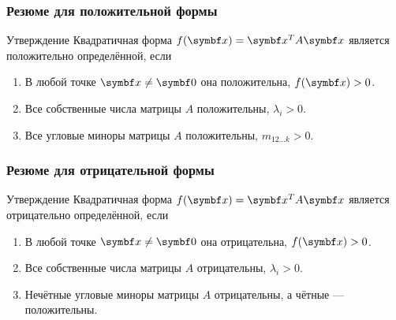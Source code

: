 \begin{frame}
    \frametitle{Резюме для положительной формы}

    \begin{block}{Утверждение}
        Квадратичная форма $f(\bx) = \bx^T A\bx$ является положительно определённой, если \pause

        \begin{enumerate}
            \item В любой точке $\bx\neq \bzero$ она положительна, $f(\bx) > 0$. \pause
            \item Все собственные числа матрицы $A$ положительны, $\lambda_i > 0$. \pause
            \item Все угловые миноры матрицы $A$ положительны, $m_{12\ldots k} > 0$.
        \end{enumerate}
            
    \end{block}


\end{frame}


\begin{frame}
    \frametitle{Резюме для отрицательной формы}

    \begin{block}{Утверждение}
        Квадратичная форма $f(\bx) = \bx^T A\bx$ является отрицательно определённой, если \pause

        \begin{enumerate}
            \item В любой точке $\bx\neq \bzero$ она отрицательна, $f(\bx) > 0$. \pause
            \item Все собственные числа матрицы $A$ отрицательны, $\lambda_i > 0$. \pause
            \item Нечётные угловые миноры матрицы $A$ отрицательны, а чётные — положительны.
        \end{enumerate}
            
    \end{block}


\end{frame}




